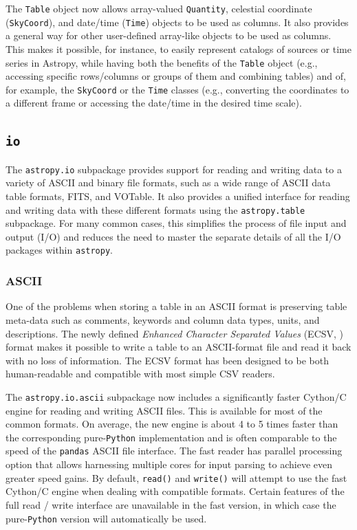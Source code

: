 \documentclass[modern]{aastex61}
\newcommand{\package}[1]{\texttt{#1}\xspace}
\newcommand{\python}{\package{Python}}
\newcommand{\astropy}{Astropy\xspace}
\newcommand{\astropypkg}{\package{astropy}}
\begin{document}
The \texttt{Table} object now allows array-valued \texttt{Quantity}, celestial
coordinate (\texttt{SkyCoord}), and date/time (\texttt{Time}) objects to
be used as columns. It also provides a general way for other user-defined
array-like objects to be used as columns.
This makes it possible, for instance, to easily
represent catalogs of sources or time series in \astropy, while having both the
benefits of the \texttt{Table} object (e.g., accessing specific rows/columns
or groups of them and combining tables) and of, for example,
the \texttt{SkyCoord} or the \texttt{Time} classes (e.g., converting the
coordinates to a different frame or accessing the date/time in the desired time scale).

\subsection{\package{io}}

The \package{astropy.io} subpackage provides support for reading and writing
data to a variety of ASCII and binary file formats, such as a wide range of
ASCII data table formats, FITS, and VOTable.
It also provides a unified interface for reading and writing data with these
different formats using the \package{astropy.table} subpackage.
For many common cases, this simplifies the process of file input and output (I/O) and
reduces the need to master the separate details of all the I/O packages within
\astropypkg.

\subsubsection{ASCII}

One of the problems when storing a table in an ASCII format is
preserving table meta-data such as comments, keywords and column data
types, units, and descriptions. The newly defined \emph{Enhanced
Character Separated Values} (ECSV,  \citealt{ape6}) format makes it
possible to write a table to an ASCII-format file and read it back
with no loss of information. The ECSV format has been designed to be
both human-readable and compatible with most simple CSV readers.

The \package{astropy.io.ascii} subpackage now includes a significantly faster
Cython/C engine for reading and writing ASCII files. This is available for most
of the common formats.  On average, the new engine is about 4 to 5 times faster
than the corresponding pure-\python implementation and is often comparable to
the speed of the \package{pandas} \citep{pandas} ASCII file interface.  The
fast reader has parallel processing option that allows harnessing multiple
cores for input parsing to achieve even greater speed gains.  By default,
\texttt{read()} and \texttt{write()} will attempt to use the fast Cython/C engine
when dealing with compatible formats. Certain features of the full read
/ write interface are unavailable in the fast version, in which case the
pure-\python version will automatically be used.
\end{document}
